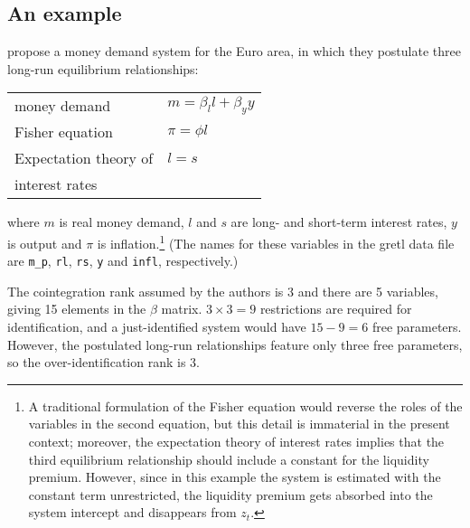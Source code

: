\subsection{An example}
\label{sec:vecm-overid-ex}

\cite{brand-cassola04} propose a money demand system for the Euro
area, in which they postulate three long-run equilibrium
relationships:
%
\begin{center}
\begin{tabular}{ll}
  money demand & $m = \beta_l l + \beta_y y$ \\
  Fisher equation & $\pi = \phi l$ \\
  Expectation theory of & $l = s$ \\ [-4pt]
  interest rates
\end{tabular}
\end{center}
%
where $m$ is real money demand, $l$ and $s$ are long- and short-term
interest rates, $y$ is output and $\pi$ is inflation.\footnote{A
  traditional formulation of the Fisher equation would reverse the
  roles of the variables in the second equation, but this detail is
  immaterial in the present context; moreover, the expectation theory
  of interest rates implies that the third equilibrium relationship
  should include a constant for the liquidity premium. However, since
  in this example the system is estimated with the constant term
  unrestricted, the liquidity premium gets absorbed into the system
  intercept and disappears from $z_t$.}  (The names for these
variables in the gretl data file are \verb|m_p|, \texttt{rl},
\texttt{rs}, \texttt{y} and \texttt{infl}, respectively.)

The cointegration rank assumed by the authors is 3 and there are 5
variables, giving 15 elements in the $\beta$ matrix.  $3 \times 3 = 9$
restrictions are required for identification, and a just-identified
system would have $15 - 9 = 6$ free parameters.  However, the
postulated long-run relationships feature only three free parameters,
so the over-identification rank is 3.


